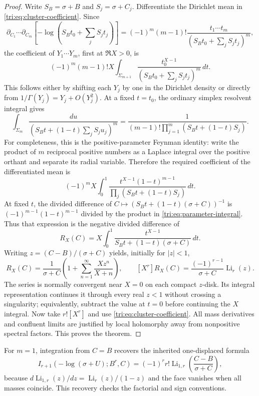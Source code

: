 \documentclass[11pt,a4paper]{article}
\theoremstyle{definition}
\theoremstyle{remark}
\numberwithin{equation}{section}
\begin{document}
\begin{proof}
Write $S_B=\sigma+B$ and $S_j=\sigma+C_j$. Differentiate the
Dirichlet mean in \eqref{tri:eq:cluster-coefficient}. Since
\[
 \partial_{C_1}\cdots\partial_{C_m}
   [-\log(S_Bt_0+\sum_jS_jt_j)]
  =(-1)^m(m-1)!\frac{t_1\cdots t_m}
                      {(S_Bt_0+\sum_jS_jt_j)^m},
\]
the coefficient of $Y_1\cdots Y_m$, first at $\Re X>0$, is
\[
 (-1)^m(m-1)!X\int_{\Sigma_{m+1}}
        \frac{t_0^{X-1}}{(S_Bt_0+\sum_jS_jt_j)^m}\,dt.
\]
This follows either by shifting each $Y_j$ by one in the Dirichlet
density or directly from $1/\Gamma(Y_j)=Y_j+O(Y_j^2)$.
At a fixed $t=t_0$, the ordinary simplex resolvent integral gives
\[
 \int_{\Sigma_m}\frac{du}
       {(S_Bt+(1-t)\sum_jS_ju_j)^m}
  =\frac{1}{(m-1)!\prod_{j=1}^m(S_Bt+(1-t)S_j)}.
\]
For completeness, this is the positive-parameter Feynman identity:
write the product of $m$ reciprocal positive numbers as a Laplace
integral over the positive orthant and separate its radial variable.
Therefore the required coefficient of the differentiated mean is
\begin{equation}\label{tri:eq:parameter-integral}
 (-1)^mX\int_0^1
  \frac{t^{X-1}(1-t)^{m-1}}
       {\prod_j(S_Bt+(1-t)S_j)}\,dt.
\end{equation}
At fixed $t$, the divided difference of
$C\mapsto(S_Bt+(1-t)(\sigma+C))^{-1}$ is
$(-1)^{m-1}(1-t)^{m-1}$ divided by the product in
\eqref{tri:eq:parameter-integral}. Thus that expression is the
negative divided difference of
\[
 R_X(C)=X\int_0^1
             \frac{t^{X-1}}{S_Bt+(1-t)(\sigma+C)}\,dt.
\]
Writing $z=(C-B)/(\sigma+C)$ yields, initially for $|z|<1$,
\begin{equation}\label{tri:eq:RX}
 R_X(C)=\frac1{\sigma+C}
       \left(1+\sum_{n=1}^{\infty}\frac{Xz^n}{X+n}\right),
 \qquad
 [X^r]R_X(C)=\frac{(-1)^{r-1}}{\sigma+C}\operatorname{Li}_r(z).
\end{equation}
The series is normally convergent near $X=0$ on each compact
$z$-disk. Its integral representation continues it through every
real $z<1$ without crossing a singularity; equivalently, subtract
the value at $t=0$ before continuing the $X$ integral. Now take
$r![X^r]$ and use \eqref{tri:eq:cluster-coefficient}. All mass
derivatives and confluent limits are justified by local holomorphy
away from nonpositive spectral factors. This proves the theorem.
\end{proof}

For $m=1$, integration from $C=B$ recovers the inherited
one-displaced formula
\begin{equation}\label{tri:eq:one-displaced}
 I_{r+1}(-\log(\sigma+U);B^r,C)
   =(-1)^r r!\operatorname{Li}_{1,r}
                         \!\left(\frac{C-B}{\sigma+C}\right),
\end{equation}
because $d\operatorname{Li}_{1,r}(z)/dz=
\operatorname{Li}_r(z)/(1-z)$ and the face vanishes when all masses
coincide. This recovery checks the factorial and sign conventions.
\end{document}
